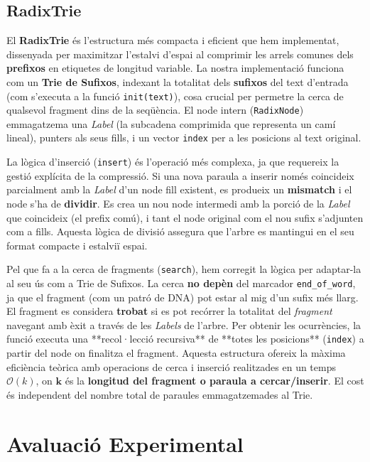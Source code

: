 \subsection{RadixTrie}
El \textbf{RadixTrie} és l'estructura més compacta i eficient que hem implementat, dissenyada per maximitzar l'estalvi d'espai al comprimir les arrels comunes dels \textbf{prefixos} en etiquetes de longitud variable. La nostra implementació funciona com un \textbf{Trie de Sufixos}, indexant la totalitat dels \textbf{sufixos} del text d'entrada (com s'executa a la funció \texttt{init(text)}), cosa crucial per permetre la cerca de qualsevol fragment dins de la seqüència. El node intern (\texttt{RadixNode}) emmagatzema una \textit{Label} (la subcadena comprimida que representa un camí lineal), punters als seus fills, i un vector \texttt{index} per a les posicions al text original.

La lògica d'inserció (\texttt{insert}) és l'operació més complexa, ja que requereix la gestió explícita de la compressió. Si una nova paraula a inserir només coincideix parcialment amb la \textit{Label} d'un node fill existent, es produeix un \textbf{mismatch} i el node s'ha de \textbf{dividir}. Es crea un nou node intermedi amb la porció de la \textit{Label} que coincideix (el prefix comú), i tant el node original com el nou sufix s'adjunten com a fills. Aquesta lògica de divisió assegura que l'arbre es mantingui en el seu format compacte i estalviï espai.

Pel que fa a la cerca de fragments (\texttt{search}), hem corregit la lògica per adaptar-la al seu ús com a Trie de Sufixos. La cerca \textbf{no depèn} del marcador \texttt{end\_of\_word}, ja que el fragment (com un patró de DNA) pot estar al mig d'un sufix més llarg. El fragment es considera \textbf{trobat} si es pot recórrer la totalitat del \textit{fragment} navegant amb èxit a través de les \textit{Labels} de l'arbre. Per obtenir les ocurrències, la funció executa una **recol·lecció recursiva** de **totes les posicions** (\texttt{index}) a partir del node on finalitza el fragment. Aquesta estructura ofereix la màxima eficiència teòrica amb operacions de cerca i inserció realitzades en un temps $\mathcal{O}(k)$, on $\boldsymbol{k}$ és la \textbf{longitud del fragment o paraula a cercar/inserir}. El cost és independent del nombre total de paraules emmagatzemades al Trie.

\section{Avaluació Experimental}

